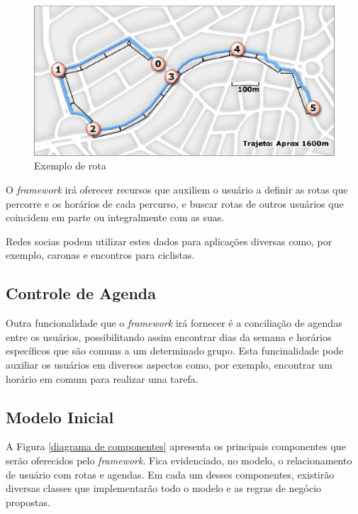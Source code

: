 \newpage

\begin{figure}[!h]
	\centering
	\includegraphics[scale=0.55]{figuras/capitulo5/rota.eps}
	\caption[Exemplo de rota]{Exemplo de rota\footnotemark}
	\label{rota}
\end{figure}

O \textit{framework} irá oferecer recursos que auxiliem o usuário a definir as rotas que percorre e os horários de cada percurso, e buscar rotas de outros usuários que coincidem em parte ou integralmente com as suas.

Redes socias podem utilizar estes dados para aplicações diversas como, por exemplo, caronas e encontros para ciclistas.

\subsection{Controle de Agenda}

Outra funcionalidade que o \textit{framework} irá fornecer é a conciliação de agendas entre os usuários, possibilitando assim encontrar dias da semana e horários específicos que são comuns a um determinado grupo. Esta funcinalidade pode auxiliar os usuários em diversos aspectos como, por exemplo, encontrar um horário em comum para realizar uma tarefa.

\subsection{Modelo Inicial}

A Figura \ref{diagrama de componentes} apresenta os principais componentes que serão oferecidos pelo \textit{framework}. Fica evidenciado, no modelo, o relacionamento de usuário com rotas e agendas. Em cada um desses componentes, existirão diversas classes que implementarão todo o modelo e as regras de negócio propostas.

